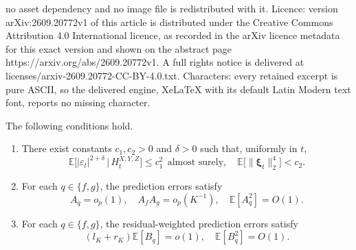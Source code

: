 \documentclass[10pt,a4paper]{amsart}
\def\E{\mathbb{E}}
\newcommand\given{\,|\,}
\begin{document}
no asset dependency and no image file is redistributed with it. Licence: version arXiv:2609.20772v1 of this article is distributed under the Creative Commons Attribution 4.0 International licence, as recorded in the arXiv licence metadata for this exact version and shown on the abstract page https://arxiv.org/abs/2609.20772v1. A full rights notice is delivered at licenses/arxiv-2609.20772-CC-BY-4.0.txt. Characters: every retained excerpt is pure ASCII, so the delivered engine, XeLaTeX with its default Latin Modern text font, reports no missing character.
\begin{assumption}
\label{ass:errors}
The following conditions hold.
\begin{enumerate}
\item[(i)] There exist constants \(c_1,c_2>0\) and \(\delta>0\)
such that, uniformly in \(t\),
\[
\E\big[|\varepsilon_t|^{2+\delta}\given H_t^{X,Y,Z}\big]\le c_1^2~~\text{almost surely},
\quad
\E\big[\|\boldsymbol\xi_t\|_2^4\big]<c_2.
\]

\item[(ii)] For each \(q\in\{f,g\}\), the prediction errors satisfy
\begin{equation}
\label{eq:Kmsemse}
A_q=o_p(1),\quad
A_fA_g=o_p(K^{-1}),\quad
\E[A_q^2]=O(1).
\end{equation}

\item[(iii)] For each \(q\in\{f,g\}\), the residual-weighted prediction
errors satisfy
\begin{equation}
\label{eq:residual-weighted-errors}
(l_K+r_K)\E[B_q]=o(1), \quad \E[B_q^2]=O(1).
\end{equation}
\end{enumerate}
\end{assumption}
\end{document}
